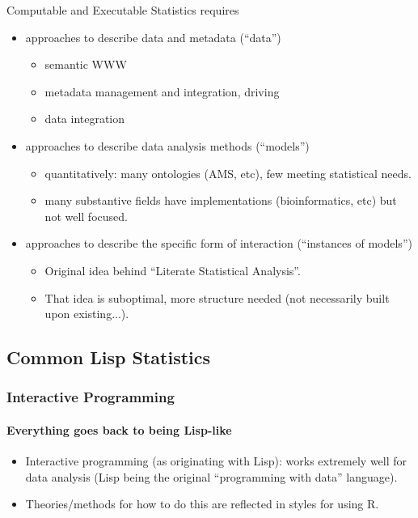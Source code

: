 \documentclass{beamer}
\begin{document}
\begin{frame}{Computable and Executable Statistics requires}

  \begin{itemize}
  \item approaches to describe data and metadata (``data'')
    \begin{itemize}
    \item semantic WWW
    \item metadata management and integration, driving
    \item data integration
    \end{itemize}
  \item approaches to describe data analysis methods (``models'')
    \begin{itemize}
    \item quantitatively: many ontologies (AMS, etc), few meeting
      statistical needs.
    \item many substantive fields have implementations
      (bioinformatics, etc) but not well focused.
    \end{itemize}
  \item approaches to describe the specific form of interaction
    (``instances of models'')
    \begin{itemize}
    \item Original idea behind ``Literate Statistical Analysis''.
    \item That idea is suboptimal, more structure needed (not
      necessarily built upon existing...).
    \end{itemize}
  \end{itemize}
\end{frame}

\subsection{Common Lisp Statistics}

\begin{frame}
  \frametitle{Interactive Programming}
  \framesubtitle{Everything goes back to being Lisp-like}
  \begin{itemize}
  \item Interactive programming (as originating with Lisp): works
    extremely well for data analysis (Lisp being the original
    ``programming with data'' language).
  \item Theories/methods for how to do this are reflected in styles
    for using R.
  \end{itemize}
\end{frame}
 
\end{document}
